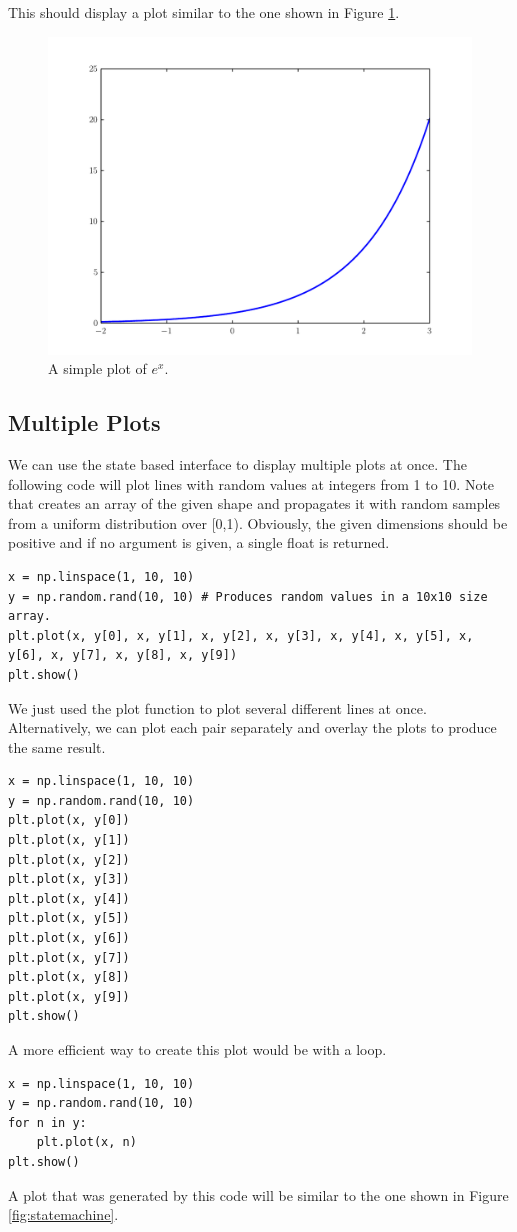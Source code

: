 This should display a plot similar to the one shown in Figure
\ref{fig:exp_plot}.

\begin{figure}
\includegraphics[width=\textwidth]{exp_plot.pdf}
\caption{A simple plot of $e^x$.} 
\label{fig:exp_plot} 
\end{figure}

\subsection*{Multiple Plots}
We can use the state based interface to display multiple plots at once. 
The following code will plot lines with random values at integers from 1 to 10. 
Note that  creates an array of the given shape and propagates it with random samples from a uniform distribution over [0,1). Obviously, the given dimensions should be positive and if no argument is given, a single float is returned. 

\begin{lstlisting}
x = np.linspace(1, 10, 10) 
y = np.random.rand(10, 10) # Produces random values in a 10x10 size array.
plt.plot(x, y[0], x, y[1], x, y[2], x, y[3], x, y[4], x, y[5], x, y[6], x, y[7], x, y[8], x, y[9])
plt.show() 
\end{lstlisting}

We just used the plot function to plot several different lines at once. Alternatively, we can plot each  pair separately and overlay the plots to produce the same result. 
\begin{lstlisting}
x = np.linspace(1, 10, 10) 
y = np.random.rand(10, 10) 
plt.plot(x, y[0]) 
plt.plot(x, y[1]) 
plt.plot(x, y[2])
plt.plot(x, y[3]) 
plt.plot(x, y[4]) 
plt.plot(x, y[5]) 
plt.plot(x, y[6])
plt.plot(x, y[7]) 
plt.plot(x, y[8]) 
plt.plot(x, y[9]) 
plt.show()
\end{lstlisting}
A more efficient way to create this plot would be with a loop.
\begin{lstlisting}
x = np.linspace(1, 10, 10) 
y = np.random.rand(10, 10) 
for n in y: 
    plt.plot(x, n) 
plt.show()
\end{lstlisting}
A plot that was generated by this code will be similar to the one shown
in Figure \ref{fig:statemachine}.

